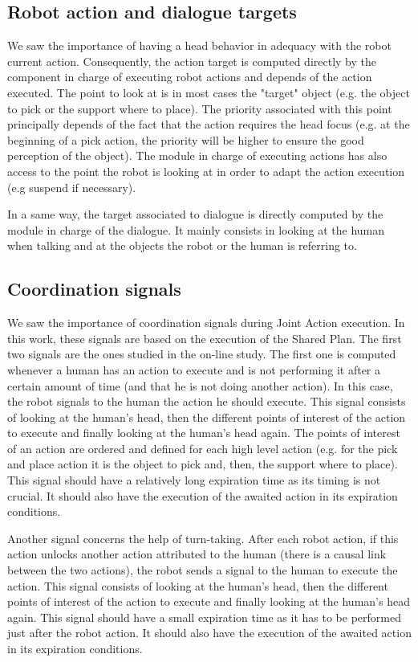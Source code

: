 \documentclass[english,a4paper,11pt,twoside]{StyleThese}
\begin{document}
\subsection{Robot action and dialogue targets}

We saw the importance of having a head behavior in adequacy with the robot current action. Consequently, the action target is computed directly by the component in charge of executing robot actions and depends of the action executed. The point to look at is in most cases the "target" object (e.g. the object to pick or the support where to place). The priority associated with this point principally depends of the fact that the action requires the head focus (e.g. at the beginning of a pick action, the priority will be higher to ensure the good perception of the object). The module in charge of executing actions has also access to the point the robot is looking at in order to adapt the action execution (e.g suspend if necessary).

In a same way, the target associated to dialogue is directly computed by the module in charge of the dialogue. It mainly consists in looking at the human when talking and at the objects the robot or the human is referring to.

\subsection{Coordination signals}

We saw the importance of coordination signals during Joint Action execution. In this work, these signals are based on the execution of the Shared Plan. The first two signals are the ones studied in the on-line study. The first one is computed whenever a human has an action to execute and is not performing it after a certain amount of time (and that he is not doing another action). In this case, the robot signals to the human the action he should execute. This signal consists of looking at the human's head, then the different points of interest of the action to execute and finally looking at the human's head again. The points of interest of an action are ordered and defined for each high level action (e.g. for the pick and place action it is the object to pick and, then, the support where to place). This signal should have a relatively long expiration  time as its timing is not crucial. It should also have the execution of the awaited action in its expiration conditions.

Another signal concerns the help of turn-taking. After each robot action, if this action unlocks another action attributed to the human (there is a causal link between the two actions), the robot sends a signal to the human to execute the action. This signal consists of looking at the human's head, then the different points of interest of the action to execute and finally looking at the human's head again. This signal should have a small expiration time as it has to be performed just after the robot action. It should also have the execution of the awaited action in its expiration conditions.
\end{document}
